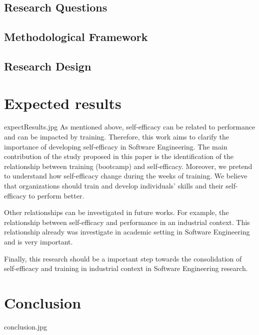 \documentclass{TheMartianReport}
\begin{document}
\subsection{Research Questions} 
\lipsum[500]

\subsection{Methodological Framework} 
\lipsum[500]

\subsection{Research Design} 
\lipsum[500]


\section{Expected results}{expectResults.jpg}
As mentioned above, self-efficacy can be related to performance and can be impacted by training. Therefore, this work aims to clarify the importance of developing self-efficacy in Software Engineering. 
The main contribution of the study proposed in this paper is the identification of the relationship between training (bootcamp) and self-efficacy. Moreover, we pretend to understand how self-efficacy change during the weeks of training.  We believe that organizations should train and develop individuals' skills and their self-efficacy to perform better. 

Other relationships can be investigated in future works. For example, the relationship between self-efficacy and performance in an industrial context.  This relationship already was investigate in academic setting \cite{davazdahemami2018training} in Software Engineering and is very important. 

Finally, this research should be a important step towards the consolidation of self-efficacy and training in industrial context in Software Engineering research.



\section{Conclusion}{conclusion.jpg}
\lipsum[500]



\end{document}
